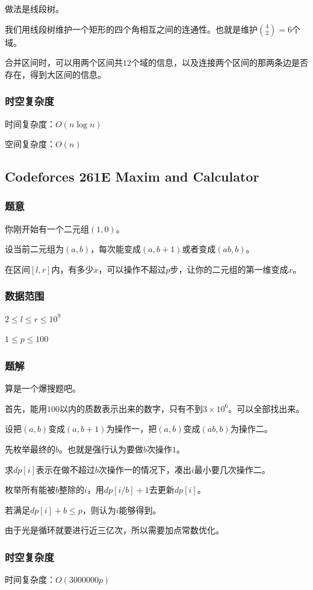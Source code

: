 \documentclass{ctexart}
\begin{document}
做法是线段树。

我们用线段树维护一个矩形的四个角相互之间的连通性。也就是维护${4 \choose 2}=6$个域。

合并区间时，可以用两个区间共$12$个域的信息，以及连接两个区间的那两条边是否存在，得到大区间的信息。
\subsubsection{时空复杂度}
时间复杂度：$O(n \log n)$

空间复杂度：$O(n)$
\subsection{Codeforces 261E Maxim and Calculator}
\subsubsection{题意}
你刚开始有一个二元组$(1,0)$。

设当前二元组为$(a,b)$，每次能变成$(a,b+1)$或者变成$(ab,b)$。

在区间$[l,r]$内，有多少$x$，可以操作不超过$p$步，让你的二元组的第一维变成$x$。
\subsubsection{数据范围}
$2 \le l \le r \le 10^9$

$1 \le p \le 100$
\subsubsection{题解}
算是一个爆搜题吧。

首先，能用$100$以内的质数表示出来的数字，只有不到$3 \times 10^6$。可以全部找出来。

设把$(a,b)$变成$(a,b+1)$为操作一，把$(a,b)$变成$(ab,b)$为操作二。

先枚举最终的$b$。也就是强行认为要做$b$次操作$1$。

求$dp[i]$表示在做不超过$b$次操作一的情况下，凑出$i$最小要几次操作二。

枚举所有能被$b$整除的$i$，用$dp[i/b]+1$去更新$dp[i]$。

若满足$dp[i]+b \le p$，则认为$i$能够得到。

由于光是循环就要进行近三亿次，所以需要加点常数优化。
\subsubsection{时空复杂度}
时间复杂度：$O(3000000p)$
\end{document}
